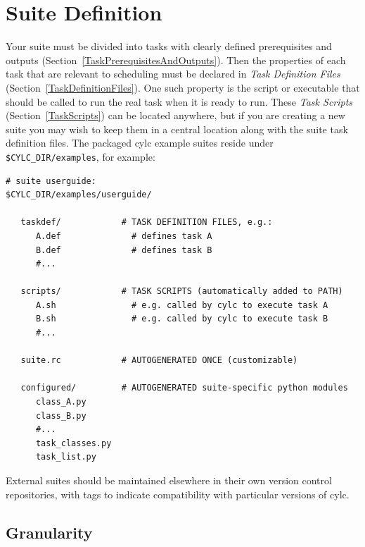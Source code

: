 \documentclass[11pt,a4paper]{article}
\begin{document}
\pagebreak
\section{Suite Definition} 
\label{SuiteDefinition}


Your suite must be divided into tasks with clearly defined
prerequisites and outputs (Section~\ref{TaskPrerequisitesAndOutputs}). Then
the properties of each task that are relevant to scheduling must be
declared in {\em Task Definition Files}
(Section~\ref{TaskDefinitionFiles}). One such property is the script or
executable that should be called to run the real task when
it is ready to run. These {\em Task Scripts} (Section~\ref{TaskScripts})
can be located anywhere, but if you are creating a new suite you may
wish to keep them in a central location along with the suite task
definition files.  The packaged cylc example suites reside under
\lstinline=$CYLC_DIR/examples=, for
example:

\lstset{language=bash}

\begin{lstlisting}
# suite userguide:
$CYLC_DIR/examples/userguide/

   taskdef/            # TASK DEFINITION FILES, e.g.:
      A.def              # defines task A
      B.def              # defines task B
      #...

   scripts/            # TASK SCRIPTS (automatically added to PATH)
      A.sh               # e.g. called by cylc to execute task A
      B.sh               # e.g. called by cylc to execute task B
      #...

   suite.rc            # AUTOGENERATED ONCE (customizable)

   configured/         # AUTOGENERATED suite-specific python modules
      class_A.py
      class_B.py
      #...
      task_classes.py
      task_list.py
\end{lstlisting}

External suites should be maintained elsewhere in their own version
control repositories, with tags to indicate compatibility with
particular versions of cylc.

\subsection{Granularity} 
\label{Granularity}
\end{document}
